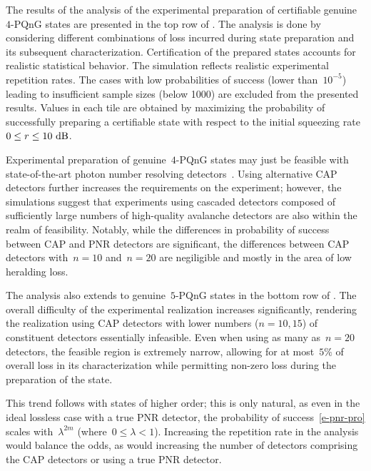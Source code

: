 \documentclass{optica-article}
\begin{document}
The results of the analysis of the experimental preparation of certifiable genuine~$4$-PQnG states are presented in the {top} row of . The analysis is done by considering different combinations of loss incurred during state preparation and its subsequent characterization. Certification of the prepared states accounts for realistic statistical behavior. The simulation reflects realistic experimental repetition rates. The cases with low probabilities of success (lower than~$10^{-5}$) leading to insufficient sample sizes (below 1000) are excluded from the presented results. Values in each tile are obtained by maximizing the probability of successfully preparing a certifiable state with respect to the initial squeezing rate~${0 \leq r \leq 10\ \mathrm{dB}}$.

Experimental preparation of genuine~$4$-PQnG states may just be feasible with state-of-the-art photon number resolving detectors~\cite{endo2021,endo2025a}. Using alternative CAP detectors further increases the requirements on the experiment; however, the simulations suggest that experiments using cascaded detectors composed of sufficiently large numbers of high-quality avalanche detectors are also within the realm of feasibility. Notably, while the differences in probability of success between CAP and PNR detectors are significant, the differences between CAP detectors with~${n = 10}$ and~${n = 20}$ are negiligible and mostly in the area of low heralding loss.

The analysis also extends to genuine~$5$-PQnG states in the {bottom} row of . The overall difficulty of the experimental realization increases significantly, rendering the realization using CAP detectors with lower numbers (${n = 10, 15}$) of constituent detectors essentially infeasible. Even when using as many as~${n = 20}$ detectors, the feasible region is extremely narrow, allowing for at most~$5\%$ of overall loss in its characterization while permitting non-zero loss during the preparation of the state.

This trend follows with states of higher order; this is only natural, as even in the ideal lossless case with a true PNR detector, the probability of success~\eqref{e-pnr-pro} scales with~${\lambda^{2m}}$ (where~${0 \leq \lambda < 1}$). Increasing the repetition rate in the analysis would balance the odds, as would increasing the number of detectors comprising the CAP detectors or using a true PNR detector.
\end{document}
